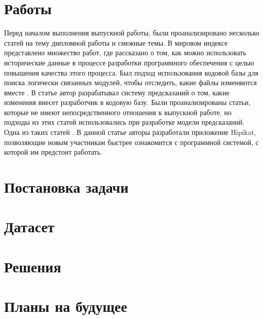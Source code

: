 \documentclass[times]{itmo-student-thesis}
\begin{document}
\section{Работы}
Перед началом выполнения выпускной работы, были проанализировано несколько статей на тему дипломной работы и смежные темы. В мировом индексе представлено множество работ, где рассказано о том, как можно использовать исторические данные в процессе разработки программного обеспечения с целью повышения качества этого процесса. Был подход использования кодовой базы для поиска логически связанных модулей, чтобы отследить, какие файлы изменяются вместе \cite{logical-modules}. В статье \cite{source-change} автор разрабатывал систему предсказаний о том, какие изменения внесет разработчик в кодовую базу. Были проанализированы статьи, которые не имеют непосредственного отношения к выпускной работе, но подходы из этих статей использовались при разработке модели предсказаний. Одна из таких статей \cite{project-memory}. В данной статье авторы разработали приложение Hipikat, позволяющие новым участникам быстрее ознакомится с программной системой, с которой им предстоит работать.
\section{Постановка задачи}
\section{Датасет}
\section{Решения}
\section{Планы на будущее}

\printmainbibliography
\end{document}

